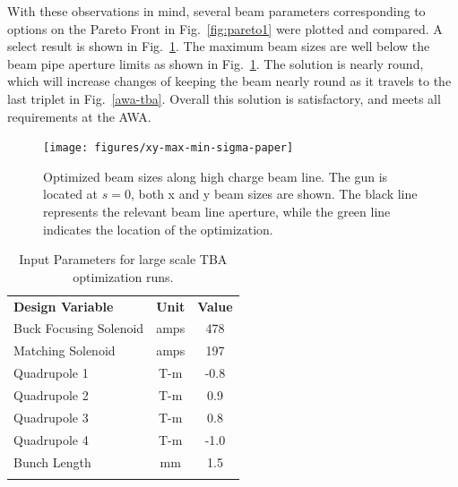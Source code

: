 With these observations in mind, several beam parameters corresponding to
options on the Pareto Front in Fig.~\ref{fig:pareto1} were plotted and compared. 
A select result is shown in Fig.~\ref{fig:stat}.  
The maximum beam sizes are well below the beam pipe aperture limits as shown in Fig.~\ref{fig:stat}.
The solution is nearly round, which will increase changes of keeping the beam nearly round
as it travels to the last triplet in Fig.~\ref{awa-tba}.
Overall this solution is satisfactory, and meets all requirements at the AWA.

\begin{figure}
	\texttt{[image: figures/xy-max-min-sigma-paper]}
	\caption{Optimized beam sizes along high charge beam line. The gun is located at $s=0$, 
	both x and y beam sizes are shown. The black line represents the relevant beam line aperture, while
	the green line indicates the location of the optimization.}
	\label{fig:stat}
\end{figure}
\begin{table}%
	\begin{center}
		\caption{Input Parameters for large scale TBA optimization runs.}
		\label{tab:designopt}   
		\begin{tabular}{l|c|c}
			\noalign{\smallskip}\hline\noalign{\smallskip}
			\textbf{Design Variable} & \textbf{Unit}	&  \textbf{Value}  \\ 
			\noalign{\smallskip}\hline\noalign{\smallskip}
			{Buck Focusing Solenoid} & amps	& 478 \\
			Matching Solenoid &	amps	& 197	  \\
			Quadrupole 1& T-m		& -0.8	\\ 
			Quadrupole 2& T-m		& 0.9	\\
			Quadrupole 3 & T-m		& 0.8	\\
			Quadrupole 4 & T-m		& -1.0	\\ 
			Bunch Length & mm 		& 1.5	\\
			\noalign{\smallskip}\hline\noalign{\smallskip}
		\end{tabular}
	\end{center}
\end{table}








